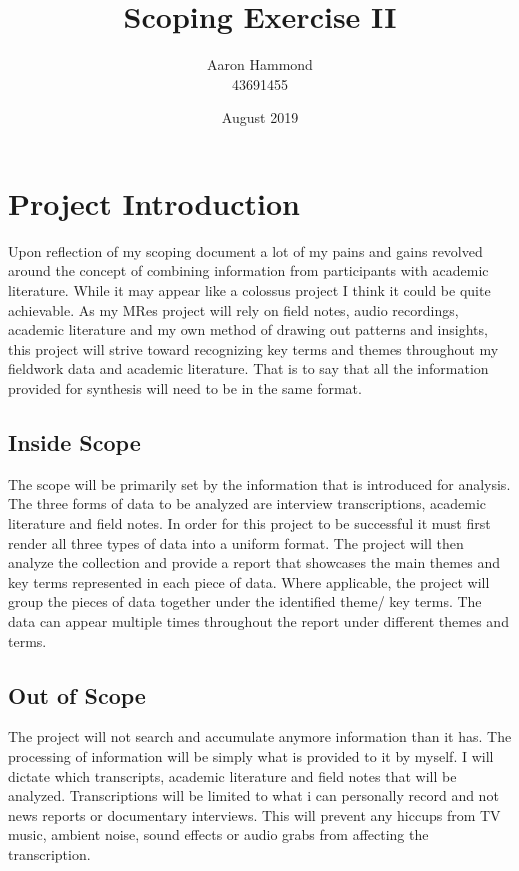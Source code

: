 \documentclass{article}
\title{Scoping Exercise II}
\author{Aaron Hammond\\43691455}
\date{August 2019}
\begin{document}
\maketitle

\tableofcontents

\newpage

\section{Project Introduction}
Upon reflection of my scoping document a lot of my pains and gains revolved around the concept of combining information from participants with academic literature. While it may appear like a colossus project I think it could be quite achievable. As my MRes project will rely on field notes, audio recordings, academic literature and my own method of drawing out patterns and insights, this project will strive toward recognizing key terms and themes throughout my fieldwork data and academic literature. That is to say that all the information provided for synthesis will need to be in the same format. 

\subsection{Inside Scope}
The scope will be primarily set by the information that is introduced for analysis. The three forms of data to be analyzed are interview transcriptions, academic literature and field notes. In order for this project to be successful it must first render all three types of data into a uniform format. The project will then analyze the collection and provide a report that showcases the main themes and key terms represented in each piece of data. Where applicable, the project will group the pieces of data together under the identified theme/ key terms. The data can appear multiple times throughout the report under different themes and terms.

\subsection{Out of Scope}
The project will not search and accumulate anymore information than it has. The processing of information will be simply what is provided to it by myself. I will dictate which transcripts, academic literature and field notes that will be analyzed. Transcriptions will be limited to what i can personally record and not news reports or documentary interviews. This will prevent any hiccups from TV music, ambient noise, sound effects or audio grabs from affecting the transcription.
\end{document}
